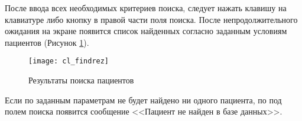 После ввода всех необходимых критериев поиска, следует нажать клавишу  на клавиатуре либо кнопку  в правой части поля поиска. После непродолжительного ожидания на экране появится список найденных согласно заданным условиям пациентов (Рисунок \ref{img_cl_findrez}). 
 
\begin{figure}[ht]\centering
 \texttt{[image: cl\_findrez]}
 \caption{Результаты поиска пациентов}
 \label{img_cl_findrez}
\end{figure} 

Если по заданным параметрам не будет найдено ни одного пациента, по под полем поиска появится сообщение <<Пациент не найден в базе данных>>.

